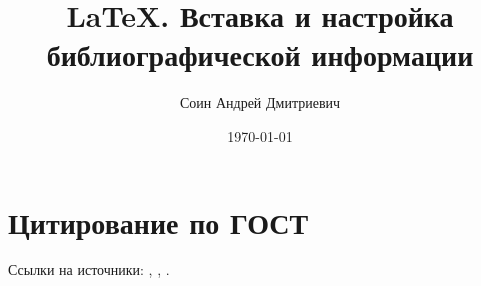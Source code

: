 \documentclass[a4paper,12pt]{article}
\author{Соин Андрей Дмитриевич}
\title{\LaTeX. Вставка и настройка библиографической информации}
\date{\today}
\begin{document}
\maketitle

\tableofcontents

\section{Цитирование по ГОСТ}

Ссылки на источники: \cite{bolzano:pb}, \cite{kojeve:adr,lakatos:fmnip}, \cite{habermas:fdm}.

\nocite{*}

\printbibliography
\end{document}
